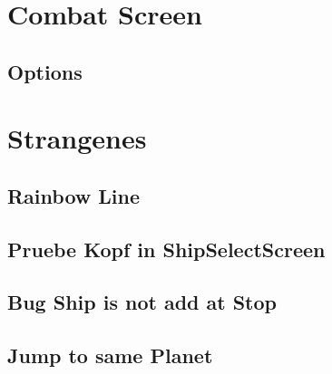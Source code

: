 \documentclass[11pt]{article}
\begin{document}
\section{Combat Screen}
\label{sec:org9c941a6}
\subsection{Options}



\section{Strangenes}
\label{sec:org4b85c14}
\subsection{Rainbow Line}
\subsection{Pruebe Kopf in ShipSelectScreen}
\subsection{Bug Ship is not add at Stop}
\subsection{Jump to same Planet}
\end{document}
